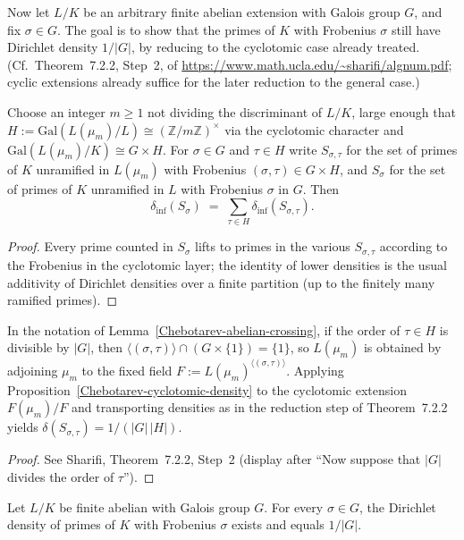 Now let $L/K$ be an arbitrary finite abelian extension with Galois group $G$, and fix
$\sigma \in G$.  The goal is to show that the primes of $K$ with Frobenius $\sigma$ still have
Dirichlet density $1/|G|$, by reducing to the cyclotomic case already treated.
(Cf.\ Theorem~7.2.2, Step~2, of \url{https://www.math.ucla.edu/~sharifi/algnum.pdf}; cyclic
extensions already suffice for the later reduction to the general case.)
\begin{lemma}\label{Chebotarev-abelian-crossing}
Choose an integer $m\geq 1$ not dividing the discriminant of $L/K$, large enough that
$H := \mathrm{Gal}(L(\mu_m)/L) \cong (\mathbb{Z}/m\mathbb{Z})^\times$ via the cyclotomic character
and $\mathrm{Gal}(L(\mu_m)/K) \cong G \times H$.  For $\sigma\in G$ and $\tau\in H$ write
$S_{\sigma,\tau}$ for the set of primes of $K$ unramified in $L(\mu_m)$ with Frobenius
$(\sigma,\tau)\in G\times H$, and $S_\sigma$ for the set of primes of $K$ unramified in $L$
with Frobenius $\sigma$ in $G$.  Then
\[
\delta_{\mathrm{inf}}(S_\sigma) \;=\; \sum_{\tau\in H} \delta_{\mathrm{inf}}(S_{\sigma,\tau}).
\]
\end{lemma}
\begin{proof}
Every prime counted in $S_\sigma$ lifts to primes in the various $S_{\sigma,\tau}$ according to
the Frobenius in the cyclotomic layer; the identity of lower densities is the usual additivity
of Dirichlet densities over a finite partition (up to the finitely many ramified primes).
\end{proof}
\begin{lemma}\label{Chebotarev-abelian-density}
In the notation of Lemma~\ref{Chebotarev-abelian-crossing}, if the order of $\tau\in H$ is
divisible by $|G|$, then $\langle(\sigma,\tau)\rangle \cap (G\times\{1\}) = \{1\}$, so
$L(\mu_m)$ is obtained by adjoining $\mu_m$ to the fixed field
$F := L(\mu_m)^{\langle(\sigma,\tau)\rangle}$.  Applying Proposition~\ref{Chebotarev-cyclotomic-density}
to the cyclotomic extension $F(\mu_m)/F$ and transporting densities as in the reduction step
of Theorem~7.2.2 yields $\delta(S_{\sigma,\tau}) = 1/(|G|\,|H|)$.
\end{lemma}
\begin{proof}
See Sharifi, Theorem~7.2.2, Step~2 (display after ``Now suppose that $|G|$ divides the order of
$\tau$'').
\end{proof}
\begin{proposition}\label{Chebotarev-abelian}
Let $L/K$ be finite abelian with Galois group $G$.  For every $\sigma\in G$, the Dirichlet
density of primes of $K$ with Frobenius $\sigma$ exists and equals $1/|G|$.
\end{proposition}
